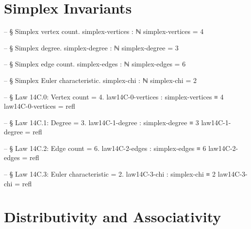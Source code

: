 \documentclass[11pt,a4paper]{book}
\begin{document}
\section{Simplex Invariants}

\begin{code}
-- § Simplex vertex count.
simplex-vertices : ℕ
simplex-vertices = 4

-- § Simplex degree.
simplex-degree : ℕ
simplex-degree = 3

-- § Simplex edge count.
simplex-edges : ℕ
simplex-edges = 6

-- § Simplex Euler characteristic.
simplex-chi : ℕ
simplex-chi = 2

-- § Law 14C.0: Vertex count = 4.
law14C-0-vertices : simplex-vertices ≡ 4
law14C-0-vertices = refl

-- § Law 14C.1: Degree = 3.
law14C-1-degree : simplex-degree ≡ 3
law14C-1-degree = refl

-- § Law 14C.2: Edge count = 6.
law14C-2-edges : simplex-edges ≡ 6
law14C-2-edges = refl

-- § Law 14C.3: Euler characteristic = 2.
law14C-3-chi : simplex-chi ≡ 2
law14C-3-chi = refl
\end{code}

\section{Distributivity and Associativity}
\end{document}
